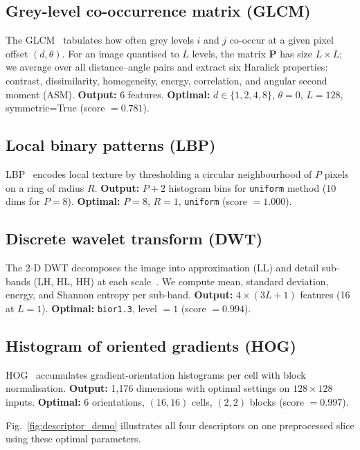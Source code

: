 

\subsection{Grey-level co-occurrence matrix (GLCM)}
\label{sec:glcm}
The GLCM~\cite{ref_fonc20231248452,ref_hsr271195} tabulates how often grey levels $i$ and $j$ co-occur at a given pixel offset $(d,\theta)$.
For an image quantised to $L$ levels, the matrix $\mathbf{P}$ has size $L\times L$; we average over all distance--angle pairs and extract six Haralick properties: contrast, dissimilarity, homogeneity, energy, correlation, and angular second moment (ASM).
\textbf{Output:} 6 features.
\textbf{Optimal:} $d\in\{1,2,4,8\}$, $\theta=0$, $L=128$, symmetric=True (score $=0.781$).

\subsection{Local binary patterns (LBP)}
\label{sec:lbp}
LBP~\cite{ref_fnins2021634926} encodes local texture by thresholding a circular neighbourhood of $P$ pixels on a ring of radius $R$.
\textbf{Output:} $P{+}2$ histogram bins for \texttt{uniform} method (10 dims for $P=8$).
\textbf{Optimal:} $P=8$, $R=1$, \texttt{uniform} (score $=1.000$).

\subsection{Discrete wavelet transform (DWT)}
\label{sec:dwt}
The 2-D DWT decomposes the image into approximation (LL) and detail sub-bands (LH, HL, HH) at each scale~\cite{ref_2409,ref_iasc2022024635}.
We compute mean, standard deviation, energy, and Shannon entropy per sub-band.
\textbf{Output:} $4\times(3L{+}1)$ features (16 at $L=1$).
\textbf{Optimal:} \texttt{bior1.3}, level $=1$ (score $=0.994$).

\subsection{Histogram of oriented gradients (HOG)}
\label{sec:hog}
HOG~\cite{ref_s41598024772437,ref_wo2023124612} accumulates gradient-orientation histograms per cell with block normalisation.
\textbf{Output:} 1{,}176 dimensions with optimal settings on $128\times128$ inputs.
\textbf{Optimal:} 6 orientations, $(16,16)$ cells, $(2,2)$ blocks (score $=0.997$).

Fig.~\ref{fig:descriptor_demo} illustrates all four descriptors on one preprocessed slice using these optimal parameters.

